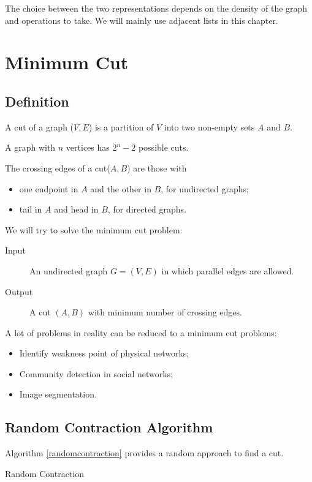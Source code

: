 The choice between the two representations depends on the density of the graph and operations to take. We will mainly use adjacent lists in this chapter.
\section{Minimum Cut}
\subsection{Definition}
\begin{definition}
A cut of a graph ($V,E$) is a partition of $V$ into two non-empty sets $A$ and $B$.
\end{definition}
A graph with $n$ vertices has $2^n-2$ possible cuts. 
\begin{definition}
The crossing edges of a cut($A,B$) are those with 
\begin{itemize}
\item one endpoint in $A$ and the other in $B$, for undirected graphs;
\item tail in $A$ and head in $B$, for directed graphs.
\end{itemize}
\end{definition}
We will try to solve the minimum cut problem:
\begin{description}
\item[Input]An undirected graph $G=(V,E)$ in which parallel edges are allowed.
\item[Output]A cut $(A,B)$ with minimum number of crossing edges.
\end{description}
A lot of problems in reality can be reduced to a minimum cut problems:
\begin{itemize}
\item Identify weakness point of physical networks;
\item Community detection in social networks;
\item Image segmentation.
\end{itemize}
\subsection{Random Contraction Algorithm}
Algorithm \ref{randomcontraction} provides a random approach to find a cut. 
\begin{algorithm}[ht]
\caption{Random Contraction}\label{randomcontraction}
\begin{algorithmic}[1]
\Input{}
\Output{}
\label{randomselection}
\EndWhile
{}
\end{algorithmic}
\end{algorithm}
